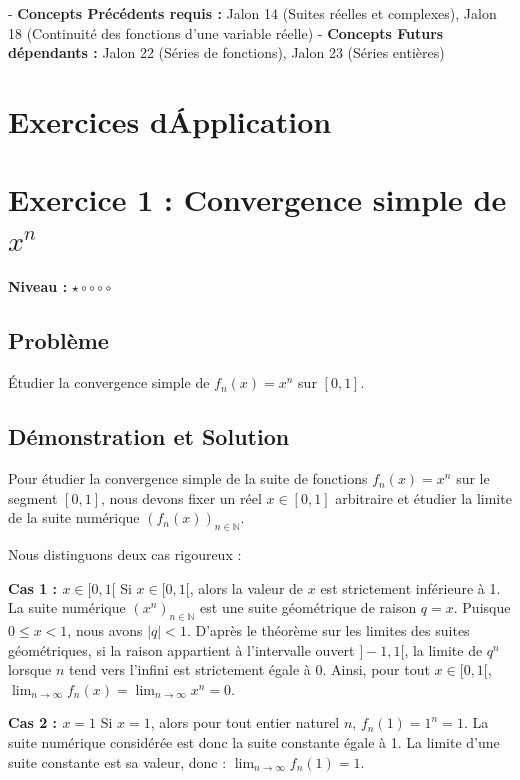 \documentclass{report}
\begin{document}
- \textbf{Concepts Précédents requis :} Jalon 14 (Suites réelles et complexes), Jalon 18 (Continuité des fonctions d'une variable réelle)
- \textbf{Concepts Futurs dépendants :} Jalon 22 (Séries de fonctions), Jalon 23 (Séries entières)

\newpage
\chapter*{Exercices d\'Application}


\chapter*{Exercice 1 : Convergence simple de $x^n$}

\textbf{Niveau :} $\star \circ \circ \circ \circ $

\section*{Problème}

Étudier la convergence simple de $f_n(x) = x^n$ sur $[0,1]$.

\section*{Démonstration et Solution}

Pour étudier la convergence simple de la suite de fonctions $f_n(x) = x^n$ sur le segment $[0,1]$, nous devons fixer un réel $x \in [0,1]$ arbitraire et étudier la limite de la suite numérique $(f_n(x))_{n \in \mathbb{N}}$.

Nous distinguons deux cas rigoureux :

\textbf{Cas 1 : $x \in [0, 1[$}
Si $x \in [0, 1[$, alors la valeur de $x$ est strictement inférieure à 1. La suite numérique $(x^n)_{n \in \mathbb{N}}$ est une suite géométrique de raison $q = x$. Puisque $0 \leq x < 1$, nous avons $|q| < 1$. D'après le théorème sur les limites des suites géométriques, si la raison appartient à l'intervalle ouvert $]-1, 1[$, la limite de $q^n$ lorsque $n$ tend vers l'infini est strictement égale à 0.
Ainsi, pour tout $x \in [0, 1[$, $\lim_{n \to \infty} f_n(x) = \lim_{n \to \infty} x^n = 0$.

\textbf{Cas 2 : $x = 1$}
Si $x = 1$, alors pour tout entier naturel $n$, $f_n(1) = 1^n = 1$. La suite numérique considérée est donc la suite constante égale à 1. La limite d'une suite constante est sa valeur, donc :
$\lim_{n \to \infty} f_n(1) = 1$.
\end{document}
